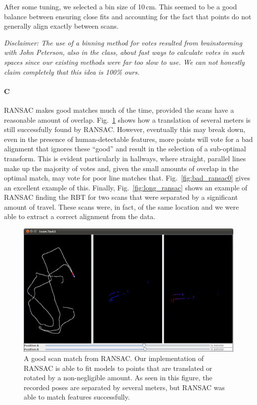 \documentclass[12pt]{article}
\begin{document}
After some tuning, we selected a bin size of 10\,cm. This seemed to be a good
balance between ensuring close fits and accounting for the fact that points do
not generally align exactly between scans.

\emph{Disclaimer: The use of a binning method for votes resulted from brainstorming with John Peterson,
    also in the class, about fast ways to calculate votes in such spaces since our existing methods
    were far too slow to use. We can not honestly claim completely that this idea is 100\% ours.}

\paragraph{C}
RANSAC makes good matches much of the time, provided the scans have a reasonable
amount of overlap. Fig.~\ref{fig:good_ransac0} shows how a translation of several
meters is still successfully found by RANSAC. However, eventually this may break
down, even in the presence of human-detectable features, more points will vote
for a bad alignment that ignores these ``good'' and result in the selection of
a sub-optimal transform. This is evident particularly in hallways, where straight,
parallel lines make up the majority of votes and, given the small amounts of overlap in
the optimal match, may vote for poor line matches that. Fig.~\ref{fig:bad_ransac0} gives
an excellent example of this. Finally, Fig.~\ref{fig:long_ransac} shows an example of
RANSAC finding the RBT for two scans that were separated by a significant amount
of travel. These scans were, in fact, of the same location and we were able to extract
a correct alignment from the data.

\begin{figure}[h!]
\centering
\includegraphics[width=.7\textwidth]{figures/Task3_good0.png}
\caption{A good scan match from RANSAC. Our implementation of RANSAC is able
to fit models to points that are translated or rotated by a non-negligible amount. As seen
in this figure, the recorded poses are separated by several meters, but RANSAC
was able to match features successfully.}
\label{fig:good_ransac0}
\end{figure}
\end{document}
